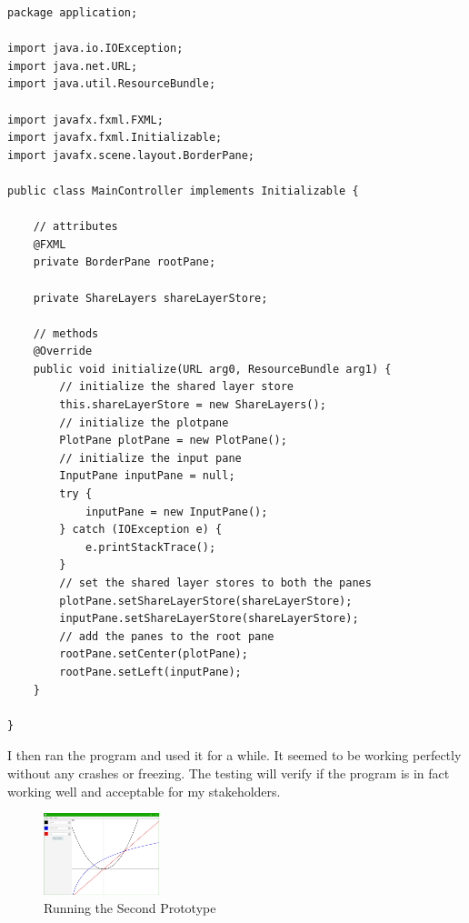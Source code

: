 \documentclass[../../../../main.tex]{subfiles}
\begin{document}
\begin{verbatim}
package application;

import java.io.IOException;
import java.net.URL;
import java.util.ResourceBundle;

import javafx.fxml.FXML;
import javafx.fxml.Initializable;
import javafx.scene.layout.BorderPane;

public class MainController implements Initializable {

	// attributes
	@FXML
	private BorderPane rootPane;

	private ShareLayers shareLayerStore;

	// methods
	@Override
	public void initialize(URL arg0, ResourceBundle arg1) {
		// initialize the shared layer store
		this.shareLayerStore = new ShareLayers();
		// initialize the plotpane
		PlotPane plotPane = new PlotPane();
		// initialize the input pane
		InputPane inputPane = null;
		try {
			inputPane = new InputPane();
		} catch (IOException e) {
			e.printStackTrace();
		}
		// set the shared layer stores to both the panes
		plotPane.setShareLayerStore(shareLayerStore);
		inputPane.setShareLayerStore(shareLayerStore);
		// add the panes to the root pane
		rootPane.setCenter(plotPane);
		rootPane.setLeft(inputPane);
	}

}
\end{verbatim}
I then ran the program and used it for a while. It seemed to be working perfectly without any crashes or freezing. The testing will verify if the program is in fact working well and acceptable for my stakeholders.
\begin{figure}[H]
	\begin{center}
		\includegraphics[width=0.3\textwidth]{images/final}
	\end{center}
	\caption{Running the Second Prototype}
\end{figure}
\newpage
\end{document}
